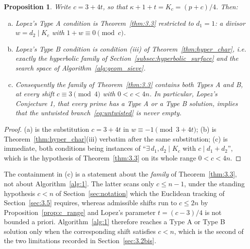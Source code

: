 \documentclass[11pt, a4paper]{article}
\theoremstyle{plain}
\newtheorem{proposition}[theorem]{Proposition}
\theoremstyle{definition}
\begin{document}
\begin{proposition}\label{prop:lopez_dictionary}
Write $c=3+4t$, so that $\kappa+1+t=K_c=(p+c)/4$. Then:
\begin{enumerate}[(a)]
    \item Lopez's Type A condition is Theorem~\ref{thm:3.3} restricted to $d_1=1$: a divisor $w=d_2\mid K_c$ with $1+w\equiv0\pmod c$.
    \item Lopez's Type B condition is condition (iii) of Theorem~\ref{thm:hyper_char}, i.e. exactly the hyperbolic family of Section~\ref{subsec:hyperbolic_surface} and the search space of Algorithm~\ref{alg:geom_sieve}.
    \item Consequently the family of Theorem~\ref{thm:3.3} contains both Types A and B, at every shift $c\equiv3\pmod4$ with $0<c<4n$. In particular, Lopez's Conjecture 1, that every prime has a Type A or a Type B solution, implies that the untwisted branch~\eqref{eq:untwisted} is never empty.
\end{enumerate}
\end{proposition}
\begin{proof}
(a) is the substitution $c=3+4t$ in $w\equiv-1\pmod{3+4t}$; (b) is Theorem~\ref{thm:hyper_char}(iii) verbatim after the same substitution; (c) is immediate, both conditions being instances of ``$\exists\,d_1,d_2\mid K_c$ with $c\mid d_1+d_2$'', which is the hypothesis of Theorem~\ref{thm:3.3} on its whole range $0<c<4n$.
\end{proof}

The containment in (c) is a statement about the \emph{family} of Theorem~\ref{thm:3.3}, not about Algorithm~\ref{alg:1}. The latter scans only $c\le n-1$, under the standing hypothesis $c<n$ of Section~\ref{sec:notation} which the Euclidean tracking of Section~\ref{sec:3.5} requires, whereas admissible shifts run to $c\le2n$ by Proposition~\ref{prop:c_range} and Lopez's parameter $t=(c-3)/4$ is not bounded a priori. Algorithm~\ref{alg:1} therefore reaches a Type A or Type B solution only when the corresponding shift satisfies $c<n$, which is the second of the two limitations recorded in Section~\ref{sec:3.2bis}.
\end{document}
